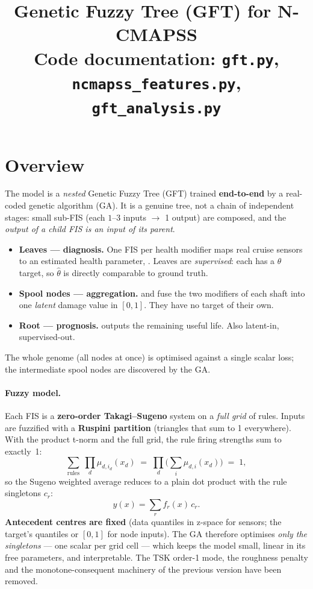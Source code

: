 \documentclass[11pt,a4paper]{article}
\title{\textbf{Genetic Fuzzy Tree (GFT) for N-CMAPSS}\\[2pt]
\large Code documentation: \texttt{gft.py}, \texttt{ncmapss\_features.py},
\texttt{gft\_analysis.py}}
\author{}
\date{}
\newcommand{\code}[1]{\texttt{\detokenize{#1}}}
\begin{document}
\maketitle
\vspace{-2.2em}

\section{Overview}

The model is a \emph{nested} Genetic Fuzzy Tree (GFT) trained \textbf{end-to-end}
by a real-coded genetic algorithm (GA). It is a genuine tree, not a chain of
independent stages: small sub-FIS (each $1$--$3$ inputs $\to$ 1 output) are
composed, and the \emph{output of a child FIS is an input of its parent}.

\begin{itemize}[leftmargin=1.4em,itemsep=1pt]
\item \textbf{Leaves --- diagnosis.} One FIS per health modifier maps real
      cruise sensors to an estimated health parameter,
      \code{[sensors] -> theta_hat}. Leaves are \emph{supervised}: each has a
      $\theta$ target, so $\hat\theta$ is directly comparable to ground truth.
\item \textbf{Spool nodes --- aggregation.} \code{hp} and \code{lp} fuse the two
      modifiers of each shaft into one \emph{latent} damage value in $[0,1]$.
      They have no target of their own.
\item \textbf{Root --- prognosis.} \code{RUL(hp, lp, age)} outputs the remaining
      useful life. Also latent-in, supervised-out.
\end{itemize}

\noindent The whole genome (all nodes at once) is optimised against a single
scalar loss; the intermediate spool nodes are discovered by the GA.

\paragraph{Fuzzy model.} Each FIS is a \textbf{zero-order Takagi--Sugeno} system
on a \emph{full grid} of rules. Inputs are fuzzified with a \textbf{Ruspini
partition} (triangles that sum to 1 everywhere). With the product t-norm and the
full grid, the rule firing strengths sum to exactly~1:
\[
  \sum_{\text{rules}} \; \prod_d \mu_{d,i_d}(x_d)
  \;=\; \prod_d \Big(\sum_i \mu_{d,i}(x_d)\Big) \;=\; 1 ,
\]
so the Sugeno weighted average reduces to a plain dot product with the rule
singletons $c_r$:
\[
  y(x)=\sum_r f_r(x)\, c_r .
\]
\textbf{Antecedent centres are fixed} (data quantiles in z-space for sensors;
the target's quantiles or $[0,1]$ for node inputs). The GA therefore optimises
\emph{only the singletons} --- one scalar per grid cell --- which keeps the model
small, linear in its free parameters, and interpretable. The TSK order-1 mode,
the roughness penalty and the monotone-consequent machinery of the previous
version have been removed.
\end{document}
